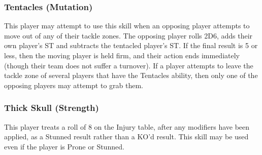 \begin{multicols}{3}
\subsubsection{Tentacles (Mutation)}
\par This player may attempt to use this skill when an opposing player attempts to move out of any of their tackle zones. The opposing player rolls 2D6, adds their own player's ST and subtracts the tentacled player's ST. If the final result is 5 or less, then the moving player is held firm, and their action ends immediately (though their team does not suffer a turnover). If a player attempts to leave the tackle zone of several players that have the Tentacles ability, then only one of the opposing players may attempt to grab them.

\subsubsection{Thick Skull (Strength)}
\par This player treats a roll of 8 on the Injury table, after any modifiers have been applied, as a Stunned result rather than a KO'd result. This skill may be used even if the player is Prone or Stunned.


\end{multicols}
